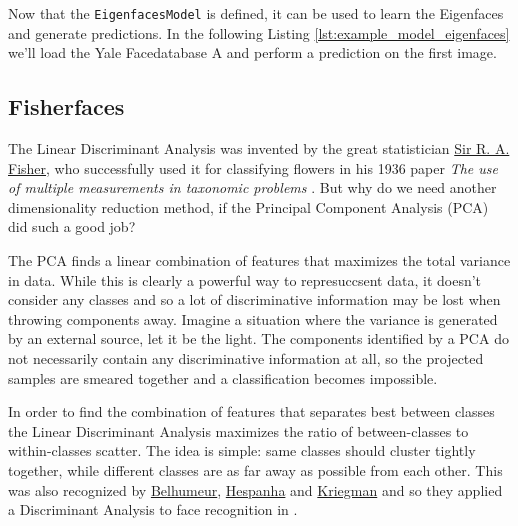 		Now that the \lstinline|EigenfacesModel| is defined, it can be used to learn the Eigenfaces and generate predictions. In the following Listing \ref{lst:example_model_eigenfaces} we'll load the Yale Facedatabase A and perform a prediction on the first image.
		
	

\fi

\subsection{Fisherfaces}

\label{ssection:fisherfaces}

The Linear Discriminant Analysis was invented by the great statistician \href{http://en.wikipedia.org/wiki/Ronald_Fisher}{Sir R. A. Fisher}, who successfully used it for classifying flowers in his 1936 paper \textit{The use of multiple measurements in taxonomic problems} \cite{Fisher36}. But why do we need another dimensionality reduction method, if the Principal Component Analysis (PCA) did such a good job? 

The PCA finds a linear combination of features that maximizes the total variance in data. While this is clearly a powerful way to represuccsent data, it doesn't consider any classes and so a lot of discriminative information may be lost when throwing components away. Imagine a situation where the variance is generated by an external source, let it be the light. The components identified by a PCA do not necessarily contain any discriminative information at all, so the projected samples are smeared together and a classification becomes impossible.

In order to find the combination of features that separates best between classes the Linear Discriminant Analysis maximizes the ratio of between-classes to within-classes scatter. The idea is simple: same classes should cluster tightly together, while different classes are as far away as possible from each other. This was also recognized by \href{http://www.cs.columbia.edu/~belhumeur/}{Belhumeur}, \href{http://www.ece.ucsb.edu/~hespanha/}{Hespanha} and \href{http://cseweb.ucsd.edu/~kriegman/}{Kriegman} and so they applied a Discriminant Analysis to face recognition in \cite{belhumeru97}. 

